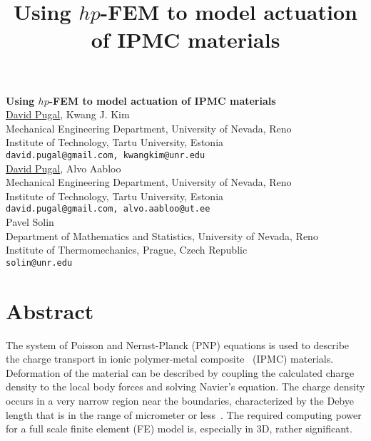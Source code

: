 \title{Using $hp$-FEM to model actuation of IPMC materials}
\author{} \institute{}

\begin{center}

\textbf{\Large Using $hp$-FEM to model actuation of IPMC materials}\\
\vspace{10mm}
{\large \underline{David Pugal}, Kwang J. Kim}\\
Mechanical Engineering Department, University of Nevada, Reno\\
Institute of Technology, Tartu University, Estonia\\
{\tt david.pugal@gmail.com, kwangkim@unr.edu}\\
\vspace{4mm}
{\large \underline{David Pugal}, Alvo Aabloo}\\
Mechanical Engineering Department, University of Nevada, Reno\\
Institute of Technology, Tartu University, Estonia\\
{\tt david.pugal@gmail.com, alvo.aabloo@ut.ee}\\
\vspace{4mm}
{\large Pavel Solin}\\
Department of Mathematics and Statistics, University of Nevada, Reno\\
Institute of Thermomechanics, Prague, Czech Republic\\
{\tt solin@unr.edu}

\end{center}

\section*{Abstract}

The system of Poisson and Nernst-Planck (PNP) equations is used to describe the charge transport in ionic polymer-metal composite~\cite{shahinpoor2001} (IPMC) materials. Deformation of the material can be described by coupling the calculated charge density to the local body forces and solving Navier's equation. The charge density occurs in a very narrow region near the boundaries, characterized by the Debye length that is in the range of micrometer or less~\cite{bazant2004diffuse}. The required computing power for a full scale finite element (FE) model is, especially in 3D, rather significant.
  
